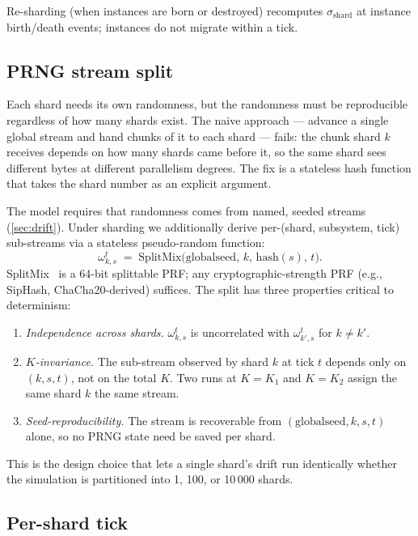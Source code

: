 \documentclass[journal,onecolumn,11pt]{IEEEtran}
\theoremstyle{definition}
\begin{document}
Re-sharding (when instances are born or destroyed) recomputes $\sigma_{\mathrm{shard}}$ at instance birth/death events; instances do not migrate within a tick.

\subsection{PRNG stream split}

Each shard needs its own randomness, but the randomness must be reproducible regardless of how many shards exist. The naive approach --- advance a single global stream and hand chunks of it to each shard --- fails: the chunk shard $k$ receives depends on how many shards came before it, so the same shard sees different bytes at different parallelism degrees. The fix is a stateless hash function that takes the shard number as an explicit argument.

The model requires that randomness comes from named, seeded streams (\cref{sec:drift}). Under sharding we additionally derive per-(shard, subsystem, tick) sub-streams via a stateless pseudo-random function:
\[
\omega^{t}_{k,s} \;=\; \mathrm{SplitMix}\!\bigl(\mathrm{globalseed},\, k,\, \mathrm{hash}(s),\, t\bigr).
\]
SplitMix~\cite{steele2014splitmix} is a 64-bit splittable PRF; any cryptographic-strength PRF (e.g., SipHash, ChaCha20-derived) suffices. The split has three properties critical to determinism:
\begin{enumerate}[leftmargin=1.5em,nosep]
\item \emph{Independence across shards.} $\omega^t_{k,s}$ is uncorrelated with $\omega^t_{k',s}$ for $k \ne k'$.
\item \emph{$K$-invariance.} The sub-stream observed by shard $k$ at tick $t$ depends only on $(k, s, t)$, not on the total $K$. Two runs at $K = K_1$ and $K = K_2$ assign the same shard $k$ the same stream.
\item \emph{Seed-reproducibility.} The stream is recoverable from $(\mathrm{globalseed}, k, s, t)$ alone, so no PRNG state need be saved per shard.
\end{enumerate}

This is the design choice that lets a single shard's drift run identically whether the simulation is partitioned into 1, 100, or 10\,000 shards.

\subsection{Per-shard tick}
\end{document}
